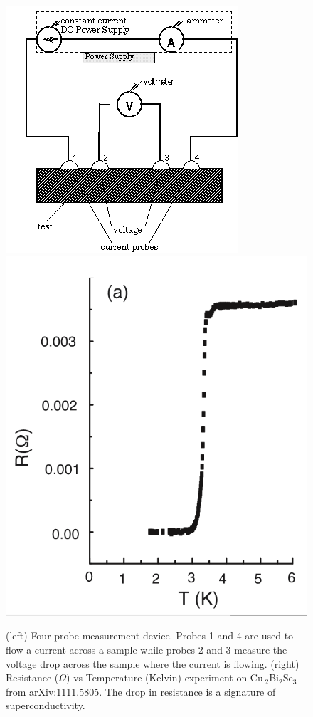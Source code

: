\begin{figure}
\center
\includegraphics[width=.45 \textwidth]{include/fourprobe.png}
\includegraphics[width=.45 \textwidth]{include/resistance.png}
\caption{(left) Four probe measurement device. Probes 1 and 4 are used to flow a current across a sample while probes 2 and 3 measure the voltage drop across the sample where the current is flowing. (right) Resistance ($\Omega$) vs Temperature (Kelvin) experiment on Cu$_{.2}$Bi$_2$Se$_3$ from arXiv:1111.5805. The drop in resistance is a signature of superconductivity. \label{measures}
}
\end{figure}
\clearpage
